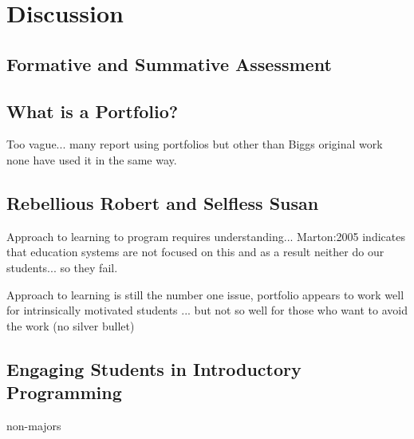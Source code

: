 
\chapter{Discussion} %
\label{cha:discussion}

\section{Formative and Summative Assessment} %
\label{sec:formative_and_summative_assessment}


\section{What is a Portfolio?} %
\label{sec:what_is_a_portfolio_}

Too vague... many report using portfolios but other than Biggs original work none have used it in the same way.


\section{Rebellious Robert and Selfless Susan} %
\label{sec:rebellious_robert_and_selfless_susan}

Approach to learning to program requires understanding... Marton:2005 indicates that education systems are not focused on this and as a result neither do our students... so they fail.

Approach to learning is still the number one issue, portfolio appears to work well for intrinsically motivated students ... but not so well for those who want to avoid the work (no silver bullet)


\section{Engaging Students in Introductory Programming} %
\label{sec:engaging_students_in_introductory_programming}


\citet{Guzdial:2005} non-majors


